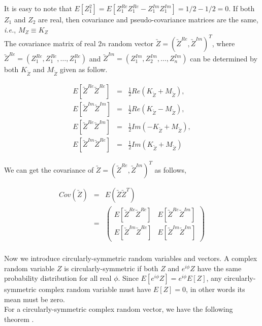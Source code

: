 It is easy to note that $E[Z_1^2] = E[Z_1^{Re}Z_1^{Re}-Z_1^{Im}Z_1^{Im}] = 1/2 -1/2 = 0$. If both $Z_1$ and $Z_2$ are real, then covariance and pseudo-covariance matrices are the same, {\em i.e.}, $M_Z \equiv K_Z$   \\

The covariance matrix of real $2n$ random vector $\utilde{Z}=(\utilde{Z}^{Re}, \utilde{Z}^{Im})^T$, where $\utilde{Z}^{Re} = (Z_1^{Re}, Z_1^{Re}, \ldots, Z_1^{Re})$ and $\utilde{Z}^{Im} =
(Z_1^{Im}, Z_2^{Im}, \ldots, Z_n^{Im})$ can be determined by both $K_{\utilde{Z}}$ and $M_{\utilde{Z}}$ given as follow.

\begin{eqnarray}
	E[\utilde{Z}^{Re}\utilde{Z}^{Re}] &=& \frac{1}{2}Re(K_{\utilde{Z}} + M_{\utilde{Z}}), \nonumber\\
	E[\utilde{Z}^{Im}\utilde{Z}^{Im}] &=& \frac{1}{2}Re(K_{\utilde{Z}} - M_{\utilde{Z}}), \nonumber\\
	E[\utilde{Z}^{Re}\utilde{Z}^{Im}] &=& \frac{1}{2}Im(-K_{\utilde{Z}} + M_{\utilde{Z}}), \nonumber\\
	E[\utilde{Z}^{Im}\utilde{Z}^{Re}] &=& \frac{1}{2}Im(K_{\utilde{Z}} + M_{\utilde{Z}}) \label{comlex_cov}
\end{eqnarray}

We can get the covariance of $\utilde{Z}=(\utilde{Z}^{Re}, \utilde{Z}^{Im})^T$ as follows,

\begin{eqnarray*}
	Cov(\utilde{Z}) &=& E(\utilde{Z}\utilde{Z}^T) \\
	&=& \left( \begin{array}{ll}
	E[\utilde{Z}^{Re}\utilde{Z}^{Re}] &  E[\utilde{Z}^{Re}\utilde{Z}^{Im}] \\
	E[\utilde{Z}^{Im}\utilde{Z}^{Re}] &  E[\utilde{Z}^{Im}\utilde{Z}^{Im}]
	\end{array}
	\right) \\
\end{eqnarray*}

Now we introduce circularly-symmetric random variables and vectors. A complex random variable $Z$ is circularly-symmetric if both $Z$ and $e^{i\phi} Z$ have the same probability distribution for all real $\phi$.  Since $E[e^{i\phi}Z] = e^{i\phi}E[Z]$, any circularly-symmetric complex random variable must have $E[Z]=0$, in other words its mean must be zero. \\

For a circularly-symmetric complex random vector, we have the following theorem \cite{Gallager2008}.\\


